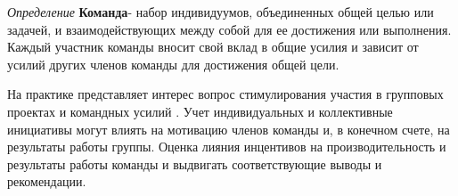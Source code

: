 \textit{Определение} \textbf{Команда}- набор индивидуумов, объединенных общей целью или задачей, и взаимодействующих между собой для ее достижения или выполнения. Каждый участник команды вносит свой вклад в общие усилия и зависит от усилий других членов команды для достижения общей цели.

На практике представляет интерес вопрос стимулирования участия в групповых проектах и командных усилий \cite{groves1973incentives}. 
Учет индивидуальных и коллективные инициативы могут влиять на мотивацию членов команды и, в конечном счете, на результаты работы группы. Оценка лияния инцентивов на производительность и результаты работы команды и выдвигать соответствующие выводы и рекомендации.


